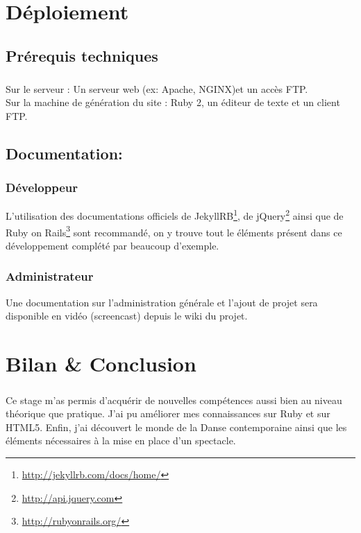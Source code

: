 \documentclass[11pt,a4paper]{report}
\begin{document}
\chapter{Déploiement}
	\section{Prérequis techniques}
		\paragraph{}Sur le serveur : Un serveur web (ex: Apache, NGINX)et un accès FTP.\\
		Sur la machine de génération du site : Ruby 2, un éditeur de texte et un client FTP.
	\section{Documentation:}
		\subsection{Développeur}L'utilisation des documentations officiels de JekyllRB\footnote{\url{http://jekyllrb.com/docs/home/}}, de jQuery\footnote{\url{http://api.jquery.com}} ainsi que de Ruby on Rails\footnote{\url{http://rubyonrails.org/}} sont recommandé, on y trouve tout le éléments présent dans ce développement complété par beaucoup d'exemple.
		\subsection{Administrateur}Une documentation sur l'administration générale et l'ajout de projet sera disponible en vidéo (screencast) depuis le wiki du projet.

\chapter{Bilan \& Conclusion}
	\paragraph*{}Ce stage m'as permis d'acquérir de nouvelles compétences aussi bien au niveau théorique que pratique. J'ai pu améliorer mes connaissances sur Ruby et sur HTML5. Enfin, j'ai découvert le monde de la Danse contemporaine ainsi que les éléments nécessaires à la mise en place d'un spectacle.
\end{document}

